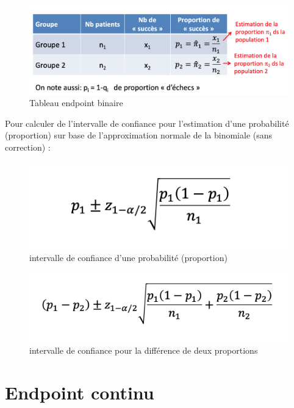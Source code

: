 \begin{figure}[H]
    \centering
    \includegraphics[scale = 0.3]{images/estimationproportion.png}
    \caption{Tableau endpoint binaire}
    \label{fig:my_label}
\end{figure}

Pour calculer de l’intervalle de confiance pour l’estimation d’une probabilité (proportion) sur base de l’approximation normale de la binomiale (sans correction) :
\begin{figure}[H]
    \centering
    \includegraphics[scale = 0.5]{images/intervalprob.png}
    \caption{intervalle de confiance d'une probabilité (proportion)}
    \label{fig:my_label}
\end{figure}

\begin{figure}[H]
    \centering
    \includegraphics[scale = 0.5]{images/intervaldiffprop.png}
    \caption{intervalle de confiance pour la différence de deux proportions}
    \label{fig:my_label}
\end{figure}


\section{Endpoint continu}

